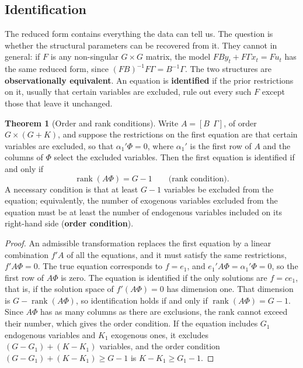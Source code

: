\documentclass[11pt,a4paper]{article}
\numberwithin{equation}{section}
\DeclareMathOperator{\rank}{rank}
\theoremstyle{definition}
\newtheorem{thm}{Theorem}[subsection]
\begin{document}
\subsection{Identification}
\label{ssec:identify}

The reduced form contains everything the data can tell us. The question is whether the structural parameters can be recovered from it. They cannot
in general: if $F$ is any non-singular $G \times G$ matrix, the model $FBy_t + F\Gamma x_t = Fu_t$ has the same reduced form, since $(FB)^{-1}F\Gamma = B^{-1}\Gamma$. The two
structures are \textbf{observationally equivalent}. An equation is \textbf{identified} if the prior restrictions on it, usually that certain variables are
excluded, rule out every such $F$ except those that leave it unchanged.

\begin{thm}[Order and rank conditions]
\label{thm:rank}
Write $A = [B\ \ \Gamma]$, of order $G \times (G + K)$, and suppose the restrictions on the first equation are that certain variables are excluded, so that
$\alpha_1'\Phi = 0$, where $\alpha_1'$ is the first row of $A$ and the columns of $\Phi$ select the excluded variables. Then the first equation is identified if and
only if
\[
\rank(A\Phi) = G - 1 \qquad\text{(rank condition)}.
\]
A necessary condition is that at least $G - 1$ variables be excluded from the equation; equivalently, the number of exogenous variables excluded from
the equation must be at least the number of endogenous variables included on its right-hand side (\textbf{order condition}).
\end{thm}

\begin{proof}
An admissible transformation replaces the first equation by a linear combination $f'A$ of all the equations, and it must satisfy the same restrictions,
$f'A\Phi = 0$. The true equation corresponds to $f = e_1$, and $e_1'A\Phi = \alpha_1'\Phi = 0$, so the first row of $A\Phi$ is zero. The equation is identified if the only solutions are
$f = ce_1$, that is, if the solution space of $f'(A\Phi) = 0$ has dimension one. That dimension is $G - \rank(A\Phi)$, so identification holds if and only if $\rank(A\Phi) = G - 1$.
Since $A\Phi$ has as many columns as there are exclusions, the rank cannot exceed their number, which gives the order condition. If the equation includes
$G_1$ endogenous variables and $K_1$ exogenous ones, it excludes $(G - G_1) + (K - K_1)$ variables, and the order condition $(G - G_1) + (K - K_1) \geq G - 1$ is
$K - K_1 \geq G_1 - 1$.
\end{proof}
\end{document}
